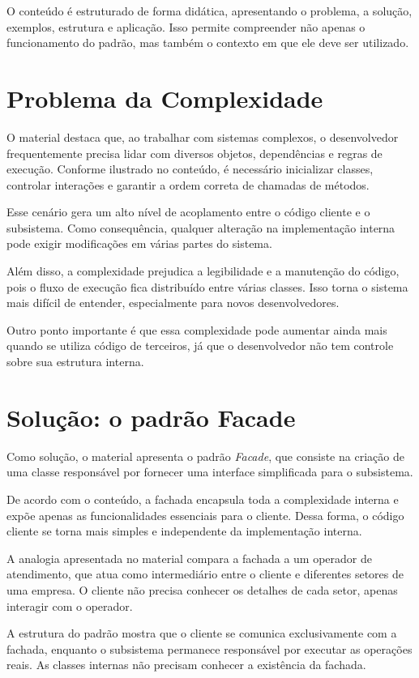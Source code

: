 \documentclass[conference]{IEEEtran}
\begin{document}
O conteúdo é estruturado de forma didática, apresentando o problema, a solução, exemplos, estrutura e aplicação. Isso permite compreender não apenas o funcionamento do padrão, mas também o contexto em que ele deve ser utilizado.

\section{Problema da Complexidade}

O material destaca que, ao trabalhar com sistemas complexos, o desenvolvedor frequentemente precisa lidar com diversos objetos, dependências e regras de execução. Conforme ilustrado no conteúdo, é necessário inicializar classes, controlar interações e garantir a ordem correta de chamadas de métodos.

Esse cenário gera um alto nível de acoplamento entre o código cliente e o subsistema. Como consequência, qualquer alteração na implementação interna pode exigir modificações em várias partes do sistema.

Além disso, a complexidade prejudica a legibilidade e a manutenção do código, pois o fluxo de execução fica distribuído entre várias classes. Isso torna o sistema mais difícil de entender, especialmente para novos desenvolvedores.

Outro ponto importante é que essa complexidade pode aumentar ainda mais quando se utiliza código de terceiros, já que o desenvolvedor não tem controle sobre sua estrutura interna.

\section{Solução: o padrão Facade}

Como solução, o material apresenta o padrão \textit{Facade}, que consiste na criação de uma classe responsável por fornecer uma interface simplificada para o subsistema.

De acordo com o conteúdo, a fachada encapsula toda a complexidade interna e expõe apenas as funcionalidades essenciais para o cliente. Dessa forma, o código cliente se torna mais simples e independente da implementação interna.

A analogia apresentada no material compara a fachada a um operador de atendimento, que atua como intermediário entre o cliente e diferentes setores de uma empresa. O cliente não precisa conhecer os detalhes de cada setor, apenas interagir com o operador.

A estrutura do padrão mostra que o cliente se comunica exclusivamente com a fachada, enquanto o subsistema permanece responsável por executar as operações reais. As classes internas não precisam conhecer a existência da fachada.
\end{document}
